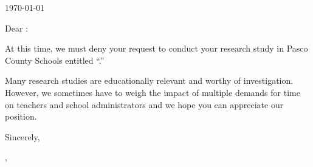 \documentclass[11pt,letterpaper]{article}
\begin{document}
\begin{footnotesize}
	\begin{spacing}{1}
  \authordetails
  \end{spacing}
\end{footnotesize}

\today

\bigskip

\studydetails

Dear \StudyAuthor:


At this time, we must deny your request to conduct your research study in Pasco
County Schools entitled ``\Study.''


Many research studies are educationally relevant and worthy of investigation. However,
we sometimes have to weigh the impact of multiple demands for time on teachers and
school administrators and we hope you can appreciate our position.

Sincerely,

\bigskip

\bigskip

\Who, \Title \newline
\Office

\bigskip

%
%
\end{document}
